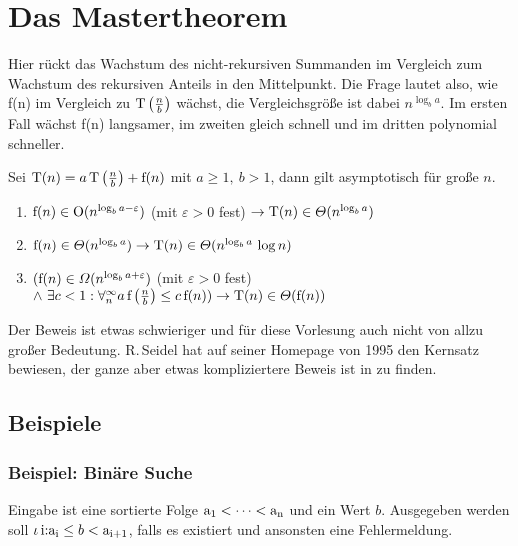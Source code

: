 \documentclass[ngerman]{scrreprt}%
\theoremstyle{break}
\begin{document}
\section{Das Mastertheorem}
Hier rückt das Wachstum des nicht-rekursiven Summanden im Vergleich zum Wachstum des rekursiven Anteils in den Mittelpunkt. Die Frage
lautet also, wie f(n) im Vergleich zu \(\textup{T}\left(\frac{n}{b}\right)\) wächst, die Vergleichsgröße ist dabei \(n^{\log_ba}\).
Im ersten Fall wächst f(n) langsamer, im zweiten gleich schnell und im dritten polynomial schneller.

Sei \(\textup{T}(n)=a\,\textup{T}\left(\frac{n}{b}\right)+\textup{f}(n)\) mit \( a \geq 1,\ b > 1\), 
dann gilt asymptotisch für große $n$.

\begin{enumerate}
\item \(\textup{f}(n) \in \textup{O}(n^{\log_ba-\varepsilon} ) \) (mit \(\varepsilon > 0\) fest) \(\rightarrow \textup{T}(n) \in\Theta(n^{\log_ba})\)

\item \(\textup{f}(n) \in\Theta(n^{\log_ba}) \rightarrow \textup{T}(n) \in\Theta(n^{\log_ba}\,\log n)\)

\item \((\textup{f}(n) \in\Omega(n^{\log_ba+\varepsilon} ) \) (mit \( \varepsilon > 0 \) fest)
\(\wedge\ \exists c < 1 : \forall^{\infty}_{n}
a\,\textup{f}\left(\frac{n}{b}\right)  \leq c\,\textup{f}(n)) \rightarrow \textup{T}(n) \in \Theta(\textup{f}(n))\)
\end{enumerate}

Der Beweis ist etwas schwieriger und für diese Vorlesung auch nicht
von allzu großer Bedeutung.
R.\,Seidel hat auf seiner Homepage
von 1995 den Kernsatz bewiesen, der ganze aber etwas kompliziertere Beweis ist in \cite{cormen} zu finden. 

\subsection{Beispiele}
\subsubsection{Beispiel: Binäre Suche} 

Eingabe ist eine sortierte Folge \(\textup{a}_1 < \dots < \textup{a}_{\textup{n}}\) und ein Wert $b$. Ausgegeben werden soll
\(\iota\,\textup{i:a}_{\textup{i}} \leq b < \textup{a}_{\textup{i+1}}\), falls es existiert und ansonsten eine Fehlermeldung.
\bigskip
\end{document}
